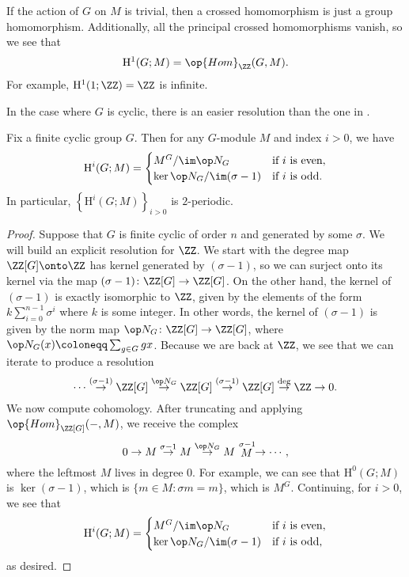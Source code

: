 \documentclass[../notes.tex]{subfiles}
\begin{document}
\begin{example}
	If the action of $G$ on $M$ is trivial, then a crossed homomorphism is just a group homomorphism. Additionally, all the principal crossed homomorphisms vanish, so we see that
	\[\mathrm H^1(G;M)=\op{Hom}_\ZZ(G,M).\]
	For example, $\mathrm H^1(1;\ZZ)=\ZZ$ is infinite.
\end{example}
In the case where $G$ is cyclic, there is an easier resolution than the one in .
\begin{proposition}
	Fix a finite cyclic group $G$. Then for any $G$-module $M$ and index $i>0$, we have
	\[\mathrm H^i(G;M)=\begin{cases}
		M^G/\im\op N_G & \text{if }i\text{ is even}, \\
		\ker{\op N_G}/\im(\sigma-1) & \text{if }i\text{ is odd}.
	\end{cases}\]
	In particular, $\left\{\mathrm H^i(G;M)\right\}_{i>0}$ is $2$-periodic.
\end{proposition}
\begin{proof}
	Suppose that $G$ is finite cyclic of order $n$ and generated by some $\sigma$. We will build an explicit resolution for $\ZZ$. We start with the degree map $\ZZ[G]\onto\ZZ$ has kernel generated by $(\sigma-1)$, so we can surject onto its kernel via the map $(\sigma-1)\colon\ZZ[G]\to\ZZ[G]$. On the other hand, the kernel of $(\sigma-1)$ is exactly isomorphic to $\ZZ$, given by the elements of the form $k\sum_{i=0}^{n-1}\sigma^i$ where $k$ is some integer. In other words, the kernel of $(\sigma-1)$ is given by the norm map $\op N_G\colon\ZZ[G]\to\ZZ[G]$, where $\op N_G(x)\coloneqq\sum_{g\in G}gx$. Because we are back at $\ZZ$, we see that we can iterate to produce a resolution
	\[\cdots\stackrel{(\sigma-1)}\to\ZZ[G]\stackrel{\op N_G}\to\ZZ[G]\stackrel{(\sigma-1)}\to\ZZ[G]\stackrel{\deg}\to\ZZ\to0.\]
	We now compute cohomology. After truncating and applying $\op{Hom}_{\ZZ[G]}(-,M)$, we receive the complex
	\[0\to M\stackrel{\sigma-1}\to M\stackrel{\op N_G}\to M\stackrel{\sigma-1} M\to\cdots,\]
	where the leftmost $M$ lives in degree $0$. For example, we can see that $\mathrm H^0(G;M)$ is $\ker(\sigma-1)$, which is $\{m\in M:\sigma m=m\}$, which is $M^G$. Continuing, for $i>0$, we see that
	\[\mathrm H^i(G;M)=\begin{cases}
		M^G/\im\op N_G & \text{if }i\text{ is even}, \\
		\ker{\op N_G}/\im(\sigma-1) & \text{if }i\text{ is odd},
	\end{cases}\]
	as desired.
\end{proof}
\end{document}
